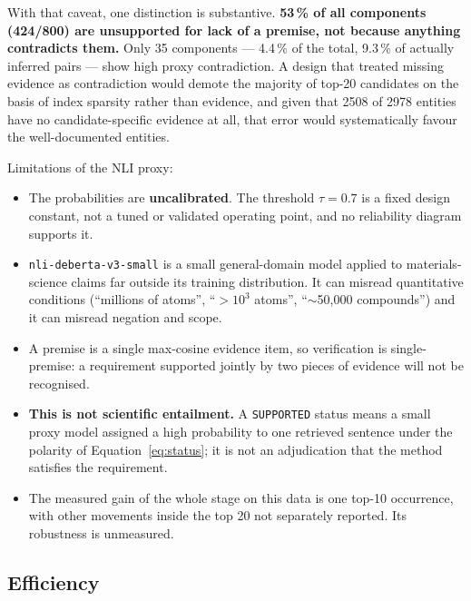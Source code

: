 \documentclass[11pt,a4paper]{article}
\begin{document}
With that caveat, one distinction is substantive. \textbf{53\,\% of all components (424/800) are unsupported
for lack of a premise, not because anything contradicts them.} Only 35 components --- 4.4\,\% of the total,
9.3\,\% of actually inferred pairs --- show high proxy contradiction. A design that treated missing evidence
as contradiction would demote the majority of top-20 candidates on the basis of index sparsity rather than
evidence, and given that 2508 of 2978 entities have no candidate-specific evidence at all, that error would
systematically favour the well-documented entities.

Limitations of the NLI proxy:

\begin{itemize}
\item The probabilities are \textbf{uncalibrated}. The threshold $\tau = 0.7$ is a fixed design constant,
not a tuned or validated operating point, and no reliability diagram supports it.
\item \texttt{nli-deberta-v3-small} is a small general-domain model applied to materials-science claims far
outside its training distribution. It can misread quantitative conditions (``millions of atoms'',
``$>10^{3}$ atoms'', ``$\sim$50{,}000 compounds'') and it can misread negation and scope.
\item A premise is a single max-cosine evidence item, so verification is single-premise: a requirement
supported jointly by two pieces of evidence will not be recognised.
\item \textbf{This is not scientific entailment.} A \texttt{SUPPORTED} status means a small proxy model
assigned a high probability to one retrieved sentence under the polarity of Equation~\eqref{eq:status}; it is
not an adjudication that the method satisfies the requirement.
\item The measured gain of the whole stage on this data is one top-10 occurrence, with other movements inside
the top 20 not separately reported. Its robustness is unmeasured.
\end{itemize}

\subsection{Efficiency}
\end{document}
